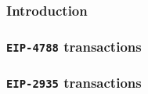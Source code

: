 \subsubsection{Introduction                     \lispNone{}}   \label{hub: tx skip: sysi: intro}          
\subsubsection{\texttt{EIP-4788} transactions   \lispTodo{}}   \label{hub: tx skip: sysi: eip 4788}       
\subsubsection{\texttt{EIP-2935} transactions   \lispTodo{}}   \label{hub: tx skip: sysi: eip 2935}       
